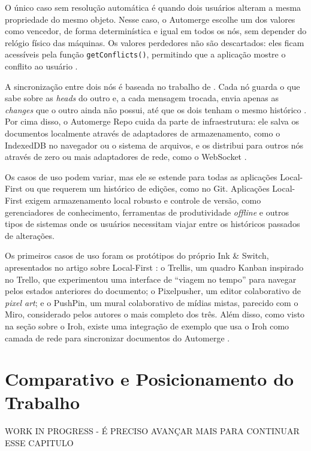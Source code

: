 O único caso sem resolução automática é quando dois usuários alteram a mesma propriedade do mesmo objeto. Nesse caso, o Automerge escolhe um dos valores como vencedor,
de forma determinística e igual em todos os nós, sem depender do relógio físico das máquinas. Os valores perdedores não são descartados: eles ficam acessíveis pela função
\texttt{getConflicts()}, permitindo que a aplicação mostre o conflito ao usuário \cite{automergeconflicts}.

A sincronização entre dois nós é baseada no trabalho de . Cada nó guarda o que sabe sobre as \textit{heads} do outro e, a cada mensagem
trocada, envia apenas as \textit{changes} que o outro ainda não possui, até que os dois tenham o mesmo histórico \cite{automergesync}. Por cima disso, o Automerge Repo
cuida da parte de infraestrutura: ele salva os documentos localmente através de adaptadores de armazenamento, como o IndexedDB no navegador ou o sistema de arquivos,
e os distribui para outros nós através de zero ou mais adaptadores de rede, como o WebSocket \cite{automergerepo}.

Os casos de uso podem variar, mas ele se estende para todas as aplicações Local-First ou que requerem um histórico de edições, como no Git. Aplicações Local-First exigem armazenamento local robusto e controle de versão, como gerenciadores de conhecimento, ferramentas de produtividade \textit{offline} e outros tipos de sistemas
onde os usuários necessitam viajar entre os históricos passados de alterações.

Os primeiros casos de uso foram os protótipos do próprio Ink \& Switch, apresentados no artigo sobre Local-First \cite{kleppmann2019}: o Trellis, um quadro Kanban inspirado no
Trello, que experimentou uma interface de ``viagem no tempo'' para navegar pelos estados anteriores do documento; o Pixelpusher, um editor colaborativo de \textit{pixel art}; e o
PushPin, um mural colaborativo de mídias mistas, parecido com o Miro, considerado pelos autores o mais completo dos três. Além disso, como visto na seção sobre o Iroh, existe
uma integração de exemplo que usa o Iroh como camada de rede para sincronizar documentos do Automerge \cite{irohautomerge}.

\section{Comparativo e Posicionamento do Trabalho}

WORK IN PROGRESS - É PRECISO AVANÇAR MAIS PARA CONTINUAR ESSE CAPITULO

